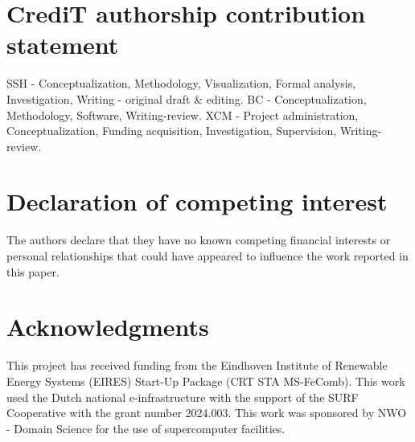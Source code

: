 \documentclass[times,twocolumn,final]{elsarticle}
\begin{document}
\section*{CrediT authorship contribution statement}

SSH - Conceptualization, Methodology, Visualization, Formal analysis, Investigation, Writing - original draft \& editing. BC - Conceptualization, Methodology, Software, Writing-review. XCM - Project administration, Conceptualization, Funding acquisition, Investigation, Supervision, Writing-review. 

\section*{Declaration of competing interest}

The authors declare that they have no known competing financial
interests or personal relationships that could have appeared to
influence the work reported in this paper.

\section*{Acknowledgments}

This project has received funding from the Eindhoven Institute of Renewable Energy Systems (EIRES) Start-Up Package (CRT STA MS-FeComb). This work used the Dutch national e-infrastructure with the support of the SURF Cooperative with the grant number 2024.003. This work was sponsored by NWO - Domain Science for the use of supercomputer facilities. 

\FloatBarrier



\end{document}
